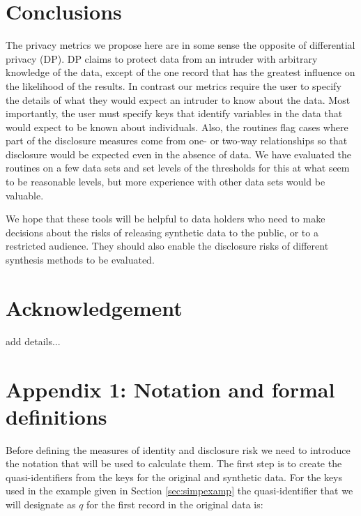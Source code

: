 \documentclass[12pt]{article}
\begin{document}
\section{Conclusions}
The privacy metrics we propose here are in some sense the opposite of differential  privacy (DP).
DP claims to protect data from an intruder with arbitrary knowledge of the data, except of
the one record that has the greatest influence on the likelihood of the results. In contrast 
our metrics require the user to specify the details of what they would expect an intruder 
to know about the data. Most importantly, the user must specify keys that identify variables in the data
that would expect to be known about individuals. Also, the routines flag cases where part of the
disclosure measures come from one- or two-way relationships so that disclosure would be
expected even in the absence of data. We have evaluated the routines on a few data sets
and set levels of the thresholds for this at what seem to be reasonable levels, but 
more experience with other data sets would be valuable.

We hope that these tools will be helpful to data holders who need to make decisions 
about the risks of releasing synthetic data to the public, or to a restricted audience.
They should also enable the disclosure risks of different synthesis methods to be evaluated.


\section{Acknowledgement}
 add details...




\section*{Appendix 1: Notation and formal definitions}{\label{sec:app1}}
Before defining the measures of identity and disclosure  risk we need to introduce the notation that will be used to calculate them. The first step is to create the quasi-identifiers from the keys for the original and synthetic data. For the keys used in the example given in Section \ref{sec:simpexamp} the  quasi-identifier that we will designate as $q$ for the first record in the original data is:


\end{document}
